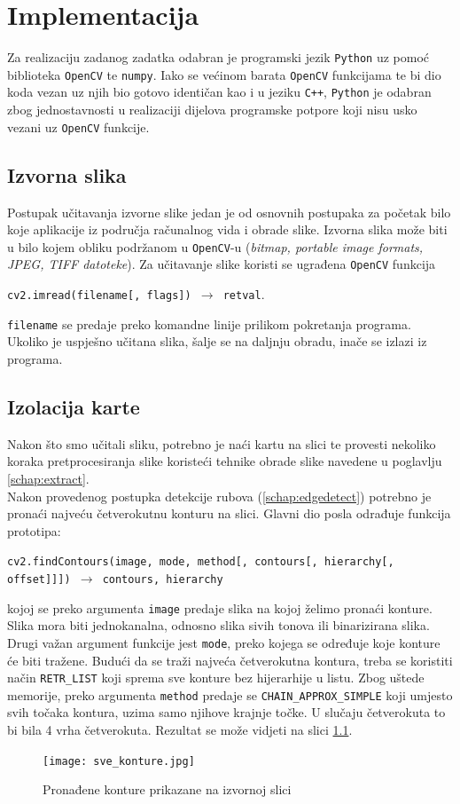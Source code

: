\documentclass[times, zavrsni, numeric, utf8]{fer}
\newcommand{\code}[1]{\texttt{#1}}
\begin{document}
\chapter{Implementacija}
\label{chap:impl}
\hspace*{0.5cm}Za realizaciju zadanog zadatka odabran je programski jezik \code{Python} uz pomoć biblioteka \code{OpenCV} te \code{numpy}. Iako se većinom barata \code{OpenCV} funkcijama te bi dio koda vezan uz njih bio gotovo identičan kao i u jeziku \code{C++}, \code{Python} je odabran zbog jednostavnosti u realizaciji dijelova programske potpore koji nisu usko vezani uz \code{OpenCV} funkcije. 
\section{Izvorna slika}
\hspace*{0.5cm}Postupak učitavanja izvorne slike jedan je od osnovnih postupaka za početak bilo koje aplikacije iz područja računalnog vida i obrade slike. 
Izvorna slika može biti u bilo kojem obliku podržanom u \code{OpenCV}-u (\textit{bitmap, portable image formats, JPEG, TIFF datoteke}). Za učitavanje slike koristi se ugrađena \code{OpenCV} funkcija
\begin{center}
\code{cv2.imread(filename[, flags]) $\rightarrow$ retval}.
\end{center}
\code{filename} se predaje preko komandne linije prilikom pokretanja programa. Ukoliko je uspješno učitana slika, šalje se na daljnju obradu, inače se izlazi iz programa. 
\section{Izolacija karte}
\label{schap:cardiso}
\hspace*{0.5cm}Nakon što smo učitali sliku, potrebno je naći kartu na slici te provesti nekoliko koraka pretprocesiranja slike koristeći tehnike obrade slike navedene u poglavlju \ref{schap:extract}. \\
Nakon provedenog postupka detekcije rubova (\ref{schap:edgedetect}) potrebno je pronaći najveću četverokutnu konturu na slici. Glavni dio posla odrađuje funkcija prototipa:
\begin{center}
\code{cv2.findContours(image, mode, method[, contours[, hierarchy[, offset]]]) $\rightarrow$ contours, hierarchy}
\end{center}
kojoj se preko argumenta \code{image} predaje slika na kojoj želimo pronaći konture. Slika mora biti jednokanalna, odnosno slika sivih tonova ili binarizirana slika. Drugi važan argument funkcije jest \code{mode}, preko kojega se određuje koje konture će biti tražene. Budući da se traži najveća četverokutna kontura, treba se koristiti način \code{RETR_LIST} koji sprema sve konture bez hijerarhije u listu. Zbog uštede memorije, preko argumenta \code{method} predaje se \code{CHAIN_APPROX_SIMPLE} koji umjesto svih točaka kontura, uzima samo njihove krajnje točke. U slučaju četverokuta to bi bila 4 vrha četverokuta. Rezultat se može vidjeti na slici \ref{fig:conts}.
\begin{figure}[H]
\centering
\texttt{[image: sve\_konture.jpg]}
\caption{Pronađene konture prikazane na izvornoj slici}
\label{fig:conts}
\end{figure}
\end{document}
